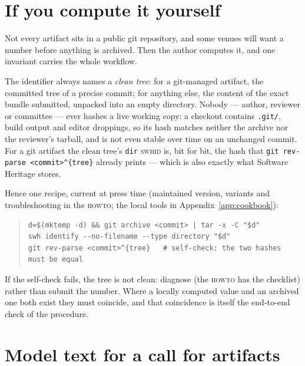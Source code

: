 \section{If you compute it yourself}
\label{sec:aec-local}

Not every artifact sits in a public git repository, and some venues will want a number before
anything is archived. Then the author computes it, and one invariant carries the whole workflow.

The identifier always names a \emph{clean tree}: for a git-managed artifact, the committed tree of
a precise commit; for anything else, the content of the exact bundle submitted, unpacked into an
empty directory. Nobody --- author, reviewer or committee --- ever hashes a live working copy: a
checkout contains \texttt{.git/}, build output and editor droppings, so its hash matches neither
the archive nor the reviewer's tarball, and is not even stable over time on an unchanged commit.
For a git artifact the clean tree's \texttt{dir} \textsc{swhid} is, bit for bit, the hash that
\verb|git rev-parse <commit>^{tree}| already prints --- which is also exactly what Software
Heritage stores.

Hence one recipe, current at press time (maintained version, variants and troubleshooting in the
\textsc{howto}; the local tools in Appendix~\ref{app:cookbook}):

\begin{quote}\footnotesize
\begin{verbatim}
d=$(mktemp -d) && git archive <commit> | tar -x -C "$d"
swh identify --no-filename --type directory "$d"
git rev-parse <commit>^{tree}   # self-check: the two hashes must be equal
\end{verbatim}
\end{quote}

\noindent If the self-check fails, the tree is not clean: diagnose (the \textsc{howto} has the
checklist) rather than submit the number. Where a locally computed value and an archived one both
exist they must coincide, and that coincidence is itself the end-to-end check of the procedure.


\section{Model text for a call for artifacts}


